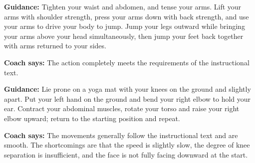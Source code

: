 \documentclass[conference,onecolumn,oneside]{IEEEtran}
\begin{document}
\vspace{0.6em}
\begin{singlespace}

\begin{tcolorbox}[
  enhanced,
  title={\textbf{Jumping Jacks} \hfill
         \textbf{Quality:}\ 0.95\ /\ 1.00 \quad \textcolor{white}{\checkmark}\ Correct},
  colback=green!4!white,
  colframe=green!55!black,
  colbacktitle=green!55!black,
  coltitle=white,
  fonttitle=\small\bfseries,
  left=4pt, right=4pt, top=3pt, bottom=3pt,
  breakable
]
  \textbf{\small Guidance:} {\small Tighten your waist and abdomen, and tense your arms.
  Lift your arms with shoulder strength, press your arms down with back strength, and use
  your arms to drive your body to jump. Jump your legs outward while bringing your arms
  above your head simultaneously, then jump your feet back together with arms returned
  to your sides.}

  \tcblower
  \textbf{\small Coach says:} {\small The action completely meets the requirements of
  the instructional text.}
\end{tcolorbox}

\vspace{0.4em}

\begin{tcolorbox}[
  enhanced,
  title={\textbf{Kneeling Side Torso Twist} \hfill
         \textbf{Quality:}\ 0.68\ /\ 1.00 \quad \textcolor{white}{\checkmark}\ Correct},
  colback=orange!5!white,
  colframe=orange!70!black,
  colbacktitle=orange!70!black,
  coltitle=white,
  fonttitle=\small\bfseries,
  left=4pt, right=4pt, top=3pt, bottom=3pt,
  breakable
]
  \textbf{\small Guidance:} {\small Lie prone on a yoga mat with your knees on the
  ground and slightly apart. Put your left hand on the ground and bend your right elbow
  to hold your ear. Contract your abdominal muscles, rotate your torso and raise your
  right elbow upward; return to the starting position and repeat.}

  \tcblower
  \textbf{\small Coach says:} {\small The movements generally follow the instructional
  text and are smooth. The shortcomings are that the speed is slightly slow, the degree
  of knee separation is insufficient, and the face is not fully facing downward at the
  start.}
\end{tcolorbox}

\vspace{0.4em}


\end{singlespace}
\end{document}
